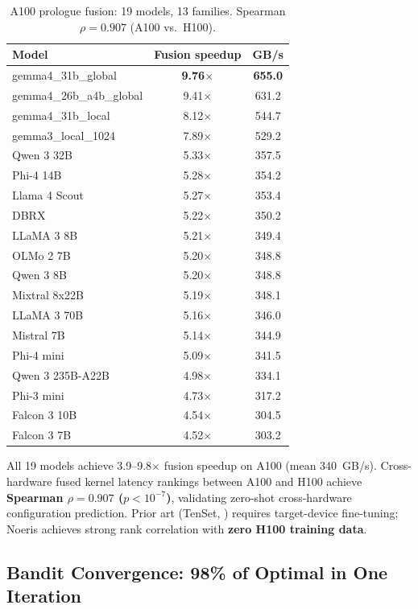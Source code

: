 \documentclass[11pt]{article}
\begin{document}
\begin{table}[t]
\centering
\caption{A100 prologue fusion: 19 models, 13 families. Spearman $\rho = 0.907$ (A100 vs.\ H100).}
\label{tab:a100-19model}
\small
\begin{tabular}{@{}lcc@{}}
\toprule
Model & Fusion speedup & GB/s \\
\midrule
gemma4\_31b\_global & \textbf{9.76$\times$} & \textbf{655.0} \\
gemma4\_26b\_a4b\_global & 9.41$\times$ & 631.2 \\
gemma4\_31b\_local & 8.12$\times$ & 544.7 \\
gemma3\_local\_1024 & 7.89$\times$ & 529.2 \\
Qwen 3 32B & 5.33$\times$ & 357.5 \\
Phi-4 14B & 5.28$\times$ & 354.2 \\
Llama 4 Scout & 5.27$\times$ & 353.4 \\
DBRX & 5.22$\times$ & 350.2 \\
LLaMA 3 8B & 5.21$\times$ & 349.4 \\
OLMo 2 7B & 5.20$\times$ & 348.8 \\
Qwen 3 8B & 5.20$\times$ & 348.8 \\
Mixtral 8x22B & 5.19$\times$ & 348.1 \\
LLaMA 3 70B & 5.16$\times$ & 346.0 \\
Mistral 7B & 5.14$\times$ & 344.9 \\
Phi-4 mini & 5.09$\times$ & 341.5 \\
Qwen 3 235B-A22B & 4.98$\times$ & 334.1 \\
Phi-3 mini & 4.73$\times$ & 317.2 \\
Falcon 3 10B & 4.54$\times$ & 304.5 \\
Falcon 3 7B & 4.52$\times$ & 303.2 \\
\bottomrule
\end{tabular}
\end{table}

All 19 models achieve 3.9--9.8$\times$ fusion speedup on A100 (mean 340~GB/s).
Cross-hardware fused kernel latency rankings between A100 and H100 achieve
\textbf{Spearman $\rho = 0.907$ ($p < 10^{-7}$)}, validating zero-shot
cross-hardware configuration prediction. Prior art (TenSet,
\citealt{tenset}) requires target-device fine-tuning; Noeris achieves
strong rank correlation with \textbf{zero H100 training data}.


\subsection{Bandit Convergence: 98\% of Optimal in One Iteration}
\label{sec:bandit-convergence}
\end{document}
